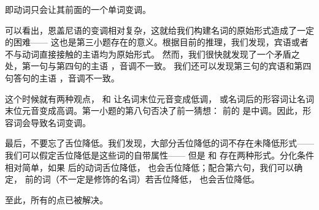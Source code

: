 即动词只会让其前面的一个单词变调。

可以看出，恩盖尼语的变调相对复杂，这就给我们构建名词的原始形式造成了一定的困难——
这也是第三小题存在的意义。根据目前的推理，我们发现，宾语或者不与动词直接接触的主语均为原始形式。
然而，我们很快就发现了一个矛盾之处，第一句与第四句的主语 ，音调不一致。
我们还可以发现第三句的宾语和第四句答句的主语 ，音调不一致。

这个时候就有两种观点， 和  让名词末位元音变成低调，
或名词后的形容词让名词末位元音变成高调。第一小题的第八句否决了前一猜想：
 前的  是中调。因此，形容词会导致名词变调。

最后，不要忘了舌位降低。我们发现，大部分舌位降低的词不存在未降低形式——我们可以假定舌位降低是这些词的自带属性——
但是  和  存在两种形式。分化条件相对简单，如果  后的动词舌位降低，
 也会舌位降低；配合第六句，我们可以确定， 前的词（不一定是修饰的名词）若舌位降低，
 也会舌位降低。

至此，所有的点已被解决。
